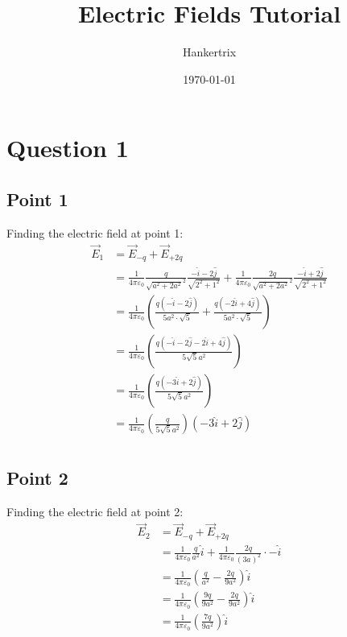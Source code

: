 \documentclass[11pt]{article}
\author{Hankertrix}
\date{\today}
\title{Electric Fields Tutorial}
\begin{document}
\maketitle
\setcounter{tocdepth}{2}
\tableofcontents \clearpage\section{Question 1}
\label{sec:orgb1e1210}

\subsection{Point 1}
\label{sec:org519e121}
Finding the electric field at point 1:
\begin{align*}
\vec{E}_1 &= \vec{E}_{-q} + \vec{E}_{+2q} \\
&= \frac{1}{4 \pi \varepsilon_0} \frac{q}{\sqrt{a^2 + 2a^2}^2} \frac{-\hat{i} - 2\hat{j}}{\sqrt{2^2 + 1^2}} + \frac{1}{4 \pi \varepsilon_0} \frac{2q}{\sqrt{a^2 +2a^2}^2} \frac{-\hat{i} + 2\hat{j}}{\sqrt{2^2 + 1^2}} \\
&= \frac{1}{4 \pi \varepsilon_0} \left( \frac{q(- \hat{i} - 2 \hat{j})}{5a^2 \cdot \sqrt{5}} + \frac{q( -2 \hat{i} + 4 \hat{j})}{5a^2 \cdot \sqrt{5}} \right) \\
&= \frac{1}{4 \pi \varepsilon_0} \left( \frac{q(- \hat{i} - 2 \hat{j} - 2 \hat{i} + 4 \hat{j})}{5 \sqrt{5} a^2} \right) \\
&= \frac{1}{4 \pi \varepsilon_0} \left( \frac{q(-3 \hat{i} + 2 \hat{j})}{5 \sqrt{5} a^2} \right) \\
&= \frac{1}{4 \pi \varepsilon_0} \left( \frac{q}{5 \sqrt{5} a^2} \right) (-3 \hat{i} + 2 \hat{j}) \\
\end{align*}
\subsection{Point 2}
\label{sec:orgf775305}
Finding the electric field at point 2:
\begin{align*}
\vec{E}_2 &= \vec{E}_{-q} + \vec{E}_{+2q} \\
&= \frac{1}{4 \pi \varepsilon_0} \frac{q}{a^2} \hat{i} + \frac{1}{4 \pi \varepsilon_0} \frac{2q}{(3a)^2} \cdot - \hat{i} \\
&= \frac{1}{4 \pi \varepsilon_0} \left( \frac{q}{a^2} - \frac{2q}{9a^2} \right) \hat{i} \\
&= \frac{1}{4 \pi \varepsilon_0} \left( \frac{9q}{9a^2} - \frac{2q}{9a^2} \right) \hat{i} \\
&= \frac{1}{4 \pi \varepsilon_0} \left( \frac{7q}{9a^2} \right) \hat{i} \\
\end{align*}
\end{document}
